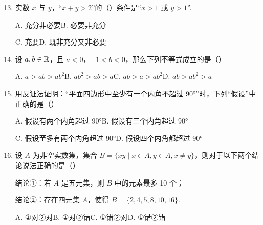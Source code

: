 \documentclass[a4paper,11pt]{article}
\begin{document}

\begin{enumerate}
\setcounter{enumi}{12}

\item 实数 $x$ 与 $y$，“$x+y>2$”的\mbox{（\quad）}条件是“$x>1$ 或 $y>1$”.

\keepwithprev
A. 充分非必要\qquad B. 必要非充分

C. 充要\qquad D. 既非充分又非必要

\ifanswer
\solbegin
{}
\solend
\fi

\item 设 $a,b\in\mathbb{R}$，且 $a<0$，$-1<b<0$，那么下列不等式成立的是\mbox{（\quad）}

\keepwithprev
A. $a>ab>ab^2$\qquad B. $ab^2>ab>a$\qquad C. $ab>a>ab^2$\qquad D. $ab>ab^2>a$

\ifanswer
\solbegin
{}
\solend
\fi

\item 用反证法证明：“平面四边形中至少有一个内角不超过 90°”时，下列“假设”中正确的是\mbox{（\quad）}

\keepwithprev
A. 假设有两个内角超过 90°\qquad B. 假设有三个内角超过 90°

C. 假设至多有两个内角超过 90°\qquad D. 假设四个内角都超过 90°

\ifanswer
{}
\fi

\item 设 $A$ 为非空实数集，集合 $B=\{xy\mid x\in A,y\in A,x\neq y\}$，则对于以下两个结论说法正确的是\mbox{（\quad）}

结论①：若 $A$ 是五元集，则 $B$ 中的元素最多 10 个；

结论②：存在四元集 $A$，使得 $B=\{2,4,5,8,10,16\}$.

\keepwithprev
A. ①对②对\qquad B. ①对②错\qquad C. ①错②对\qquad D. ①错②错


\end{enumerate}
\end{document}
